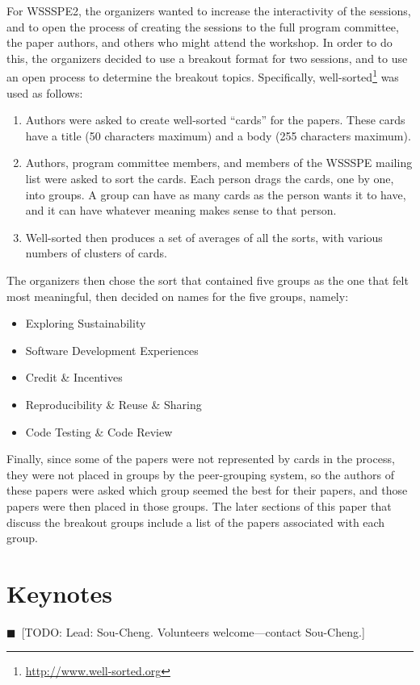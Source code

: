 \documentclass[11pt, oneside]{amsart}
\newcommand{\todo}[1]{{\color{blue}$\blacksquare$~\textsf{[TODO: #1]}}}
\begin{document}
For WSSSPE2, the organizers wanted to increase the interactivity of the
sessions, and to open the process of creating the sessions to the full program
committee, the paper authors, and others who might attend the workshop. In order
to do this, the organizers decided to use a breakout format for two sessions,
and to use an open process to determine the breakout topics. Specifically,
well-sorted\footnote{\url{http://www.well-sorted.org}} was used as follows:
\begin{enumerate}
\item Authors were asked to create well-sorted ``cards'' for the papers. These
cards have a title (50 characters maximum) and a body (255 characters maximum).
\item Authors, program committee members, and members of the WSSSPE mailing list
were asked to sort the cards. Each person drags the cards, one by one, into
groups. A group can have as many cards as the person wants it to have, and it
can have whatever meaning makes sense to that person.
\item Well-sorted then produces a set of averages of all the sorts, with various
numbers of clusters of cards.
\end{enumerate}

The organizers then chose the sort that contained five groups as the one that
felt most meaningful, then decided on names for the five groups, namely:
\begin{itemize}
\item Exploring Sustainability
\item Software Development Experiences
\item Credit \& Incentives
\item Reproducibility \& Reuse \& Sharing
\item Code Testing \& Code Review
\end{itemize}

Finally, since some of the papers were not represented by cards in the process,
they were not placed in groups by the peer-grouping system, so the authors of
these papers were asked which group seemed the best for their papers, and those
papers were then placed in those groups. The later sections of this paper that
discuss the breakout groups include a list of the papers associated with each
group.


\section{Keynotes}
\todo{Lead: Sou-Cheng. Volunteers welcome---contact Sou-Cheng.}
\end{document}
